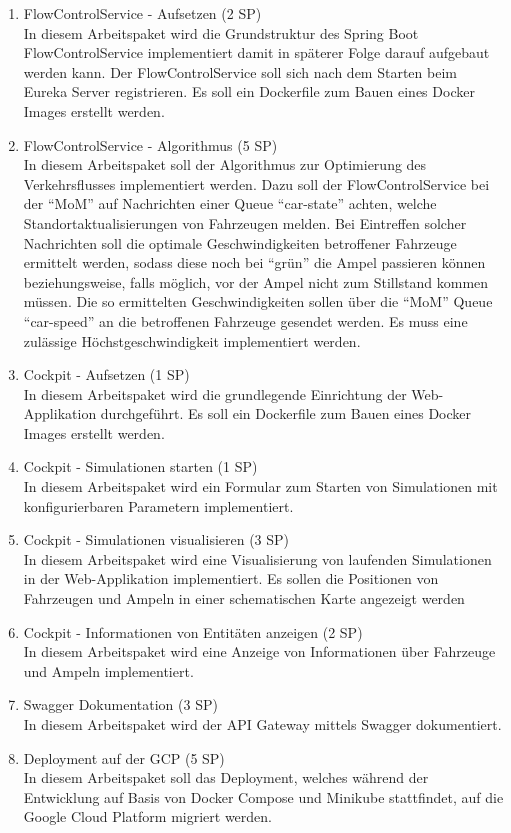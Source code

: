 \begin{enumerate}
    \item FlowControlService - Aufsetzen (2 SP)\\
  		In diesem Arbeitspaket wird die Grundstruktur des Spring Boot FlowControlService implementiert damit in späterer Folge darauf aufgebaut werden kann.
  		Der FlowControlService soll sich nach dem Starten beim Eureka Server registrieren.
  		Es soll ein Dockerfile zum Bauen eines Docker Images erstellt werden.
  \item FlowControlService - Algorithmus (5 SP)\\
  		In diesem Arbeitspaket soll der Algorithmus zur Optimierung des Verkehrsflusses implementiert werden.
  		Dazu soll der FlowControlService bei der \enquote{MoM} auf Nachrichten einer Queue \enquote{car-state} achten, welche Standortaktualisierungen von Fahrzeugen melden.
  		Bei Eintreffen solcher Nachrichten soll die optimale Geschwindigkeiten betroffener Fahrzeuge ermittelt werden, sodass diese noch bei \enquote{grün} die Ampel passieren können beziehungsweise, falls möglich, vor der Ampel nicht zum Stillstand kommen müssen.
  		Die so ermittelten Geschwindigkeiten sollen über die \enquote{MoM} Queue \enquote{car-speed} an die betroffenen Fahrzeuge gesendet werden.
  		Es muss eine zulässige Höchstgeschwindigkeit implementiert werden.
  \item Cockpit - Aufsetzen (1 SP)\\
  		In diesem Arbeitspaket wird die grundlegende Einrichtung der Web-Applikation durchgeführt.
  		Es soll ein Dockerfile zum Bauen eines Docker Images erstellt werden.
  \item Cockpit - Simulationen starten (1 SP)\\
 		In diesem Arbeitspaket wird ein Formular zum Starten von Simulationen mit konfigurierbaren Parametern implementiert.
  \item Cockpit - Simulationen visualisieren (3 SP)\\
		In diesem Arbeitspaket wird eine Visualisierung von laufenden Simulationen in der Web-Applikation implementiert.
		Es sollen die Positionen von Fahrzeugen und Ampeln in einer schematischen Karte angezeigt werden
  \item Cockpit - Informationen von Entitäten anzeigen (2 SP)\\
  		In diesem Arbeitspaket wird eine Anzeige von Informationen über Fahrzeuge und Ampeln implementiert.
  \item Swagger Dokumentation (3 SP)\\
  		In diesem Arbeitspaket wird der API Gateway mittels Swagger dokumentiert.
  \item Deployment auf der GCP (5 SP)\\
  		In diesem Arbeitspaket soll das Deployment, welches während der Entwicklung auf Basis von Docker Compose und Minikube stattfindet, auf die Google Cloud Platform migriert werden.
\end{enumerate}
